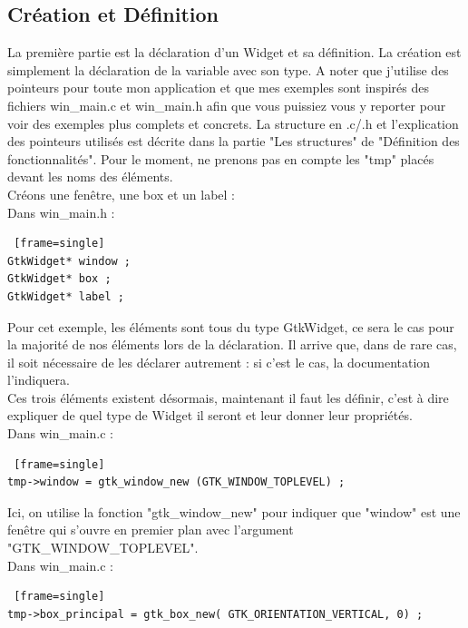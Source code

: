\documentclass[11pt,french,a4paper]{report}
\begin{document}
        \subsection{Création et Définition}

La première partie est la déclaration d'un Widget et sa définition. La création est simplement la déclaration de la variable 
avec son type. A noter que j'utilise des pointeurs pour toute mon application et que mes exemples 
sont inspirés des fichiers win\_main.c et win\_main.h afin que vous puissiez vous y reporter pour voir des exemples plus complets et
concrets. 
La structure en .c/.h et l'explication des pointeurs utilisés est décrite dans la partie "Les structures" de 
"Définition des fonctionnalités". Pour le moment, ne prenons pas en compte les "tmp" placés devant les noms des éléments. \\

Créons une fenêtre, une box et un label : \\

Dans win\_main.h : 
\begin{lstlisting} [frame=single]
GtkWidget* window ; 
GtkWidget* box ;   
GtkWidget* label ;  
\end{lstlisting}

Pour cet exemple, les éléments sont tous du type GtkWidget, ce sera le cas pour la majorité de nos éléments lors de la 
déclaration.
Il arrive que, dans de rare cas, il soit nécessaire de les déclarer autrement : si c'est le cas, la documentation l'indiquera. \\ 


Ces trois éléments existent désormais, maintenant il faut les définir, c'est à dire expliquer de quel type de Widget il seront 
et leur donner leur propriétés. \\

Dans win\_main.c :
\begin{lstlisting} [frame=single]
tmp->window = gtk_window_new (GTK_WINDOW_TOPLEVEL) ;
\end{lstlisting}

Ici, on utilise la fonction "gtk\_window\_new" pour indiquer que "window" est une fenêtre qui s'ouvre en premier plan 
avec l'argument "GTK\_WINDOW\_TOPLEVEL". \\

Dans win\_main.c :
\begin{lstlisting} [frame=single]
tmp->box_principal = gtk_box_new( GTK_ORIENTATION_VERTICAL, 0) ;
\end{lstlisting}
\end{document}
